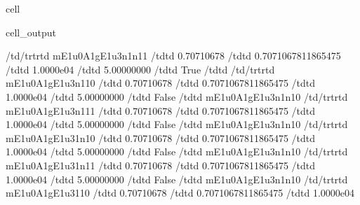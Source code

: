 \documentclass[letterpaper,table,10pt,english]{jupyterBook}
\begin{document}
\begin{sphinxuseclass}{cell}
\begin{sphinxVerbatimOutput}
\begin{sphinxuseclass}{cell_output}
\begin{sphinxVerbatim}[commandchars=\\\{\}]
\PYGZlt{}/td\PYGZgt{}\PYGZlt{}/tr\PYGZgt{}\PYGZlt{}tr\PYGZgt{}\PYGZlt{}td\PYGZgt{} m\PYGZus{}E1u\PYGZus{}0\PYGZus{}A1g\PYGZus{}E1u\PYGZus{}3\PYGZus{}n1\PYGZus{}n1\PYGZus{}1 \PYGZlt{}/td\PYGZgt{}\PYGZlt{}td\PYGZgt{}  0.70710678 \PYGZlt{}/td\PYGZgt{}\PYGZlt{}td\PYGZgt{} 0.7071067811865475 \PYGZlt{}/td\PYGZgt{}\PYGZlt{}td\PYGZgt{}  1.0000e\PYGZhy{}04 \PYGZlt{}/td\PYGZgt{}\PYGZlt{}td\PYGZgt{}  5.00000000 \PYGZlt{}/td\PYGZgt{}\PYGZlt{}td\PYGZgt{} True \PYGZlt{}/td\PYGZgt{}\PYGZlt{}td\PYGZgt{}  \PYGZlt{}/td\PYGZgt{}\PYGZlt{}/tr\PYGZgt{}\PYGZlt{}tr\PYGZgt{}\PYGZlt{}td\PYGZgt{} m\PYGZus{}E1u\PYGZus{}0\PYGZus{}A1g\PYGZus{}E1u\PYGZus{}3\PYGZus{}n1\PYGZus{}1\PYGZus{}0 \PYGZlt{}/td\PYGZgt{}\PYGZlt{}td\PYGZgt{}  0.70710678 \PYGZlt{}/td\PYGZgt{}\PYGZlt{}td\PYGZgt{} 0.7071067811865475 \PYGZlt{}/td\PYGZgt{}\PYGZlt{}td\PYGZgt{}  1.0000e\PYGZhy{}04 \PYGZlt{}/td\PYGZgt{}\PYGZlt{}td\PYGZgt{}  5.00000000 \PYGZlt{}/td\PYGZgt{}\PYGZlt{}td\PYGZgt{} False \PYGZlt{}/td\PYGZgt{}\PYGZlt{}td\PYGZgt{} m\PYGZus{}E1u\PYGZus{}0\PYGZus{}A1g\PYGZus{}E1u\PYGZus{}3\PYGZus{}n1\PYGZus{}n1\PYGZus{}0 \PYGZlt{}/td\PYGZgt{}\PYGZlt{}/tr\PYGZgt{}\PYGZlt{}tr\PYGZgt{}\PYGZlt{}td\PYGZgt{} m\PYGZus{}E1u\PYGZus{}0\PYGZus{}A1g\PYGZus{}E1u\PYGZus{}3\PYGZus{}n1\PYGZus{}1\PYGZus{}1 \PYGZlt{}/td\PYGZgt{}\PYGZlt{}td\PYGZgt{}  0.70710678 \PYGZlt{}/td\PYGZgt{}\PYGZlt{}td\PYGZgt{} 0.7071067811865475 \PYGZlt{}/td\PYGZgt{}\PYGZlt{}td\PYGZgt{}  1.0000e\PYGZhy{}04 \PYGZlt{}/td\PYGZgt{}\PYGZlt{}td\PYGZgt{}  5.00000000 \PYGZlt{}/td\PYGZgt{}\PYGZlt{}td\PYGZgt{} False \PYGZlt{}/td\PYGZgt{}\PYGZlt{}td\PYGZgt{} m\PYGZus{}E1u\PYGZus{}0\PYGZus{}A1g\PYGZus{}E1u\PYGZus{}3\PYGZus{}n1\PYGZus{}n1\PYGZus{}0 \PYGZlt{}/td\PYGZgt{}\PYGZlt{}/tr\PYGZgt{}\PYGZlt{}tr\PYGZgt{}\PYGZlt{}td\PYGZgt{} m\PYGZus{}E1u\PYGZus{}0\PYGZus{}A1g\PYGZus{}E1u\PYGZus{}3\PYGZus{}1\PYGZus{}n1\PYGZus{}0 \PYGZlt{}/td\PYGZgt{}\PYGZlt{}td\PYGZgt{}  0.70710678 \PYGZlt{}/td\PYGZgt{}\PYGZlt{}td\PYGZgt{} 0.7071067811865475 \PYGZlt{}/td\PYGZgt{}\PYGZlt{}td\PYGZgt{}  1.0000e\PYGZhy{}04 \PYGZlt{}/td\PYGZgt{}\PYGZlt{}td\PYGZgt{}  5.00000000 \PYGZlt{}/td\PYGZgt{}\PYGZlt{}td\PYGZgt{} False \PYGZlt{}/td\PYGZgt{}\PYGZlt{}td\PYGZgt{} m\PYGZus{}E1u\PYGZus{}0\PYGZus{}A1g\PYGZus{}E1u\PYGZus{}3\PYGZus{}n1\PYGZus{}n1\PYGZus{}0 \PYGZlt{}/td\PYGZgt{}\PYGZlt{}/tr\PYGZgt{}\PYGZlt{}tr\PYGZgt{}\PYGZlt{}td\PYGZgt{} m\PYGZus{}E1u\PYGZus{}0\PYGZus{}A1g\PYGZus{}E1u\PYGZus{}3\PYGZus{}1\PYGZus{}n1\PYGZus{}1 \PYGZlt{}/td\PYGZgt{}\PYGZlt{}td\PYGZgt{}  0.70710678 \PYGZlt{}/td\PYGZgt{}\PYGZlt{}td\PYGZgt{} 0.7071067811865475 \PYGZlt{}/td\PYGZgt{}\PYGZlt{}td\PYGZgt{}  1.0000e\PYGZhy{}04 \PYGZlt{}/td\PYGZgt{}\PYGZlt{}td\PYGZgt{}  5.00000000 \PYGZlt{}/td\PYGZgt{}\PYGZlt{}td\PYGZgt{} False \PYGZlt{}/td\PYGZgt{}\PYGZlt{}td\PYGZgt{} m\PYGZus{}E1u\PYGZus{}0\PYGZus{}A1g\PYGZus{}E1u\PYGZus{}3\PYGZus{}n1\PYGZus{}n1\PYGZus{}0 \PYGZlt{}/td\PYGZgt{}\PYGZlt{}/tr\PYGZgt{}\PYGZlt{}tr\PYGZgt{}\PYGZlt{}td\PYGZgt{} m\PYGZus{}E1u\PYGZus{}0\PYGZus{}A1g\PYGZus{}E1u\PYGZus{}3\PYGZus{}1\PYGZus{}1\PYGZus{}0 \PYGZlt{}/td\PYGZgt{}\PYGZlt{}td\PYGZgt{}  0.70710678 \PYGZlt{}/td\PYGZgt{}\PYGZlt{}td\PYGZgt{} 0.7071067811865475 \PYGZlt{}/td\PYGZgt{}\PYGZlt{}td\PYGZgt{}  1.0000e\PYGZhy{}04 
\end{sphinxVerbatim}
\end{sphinxuseclass}
\end{sphinxVerbatimOutput}
\end{sphinxuseclass}
\end{document}
